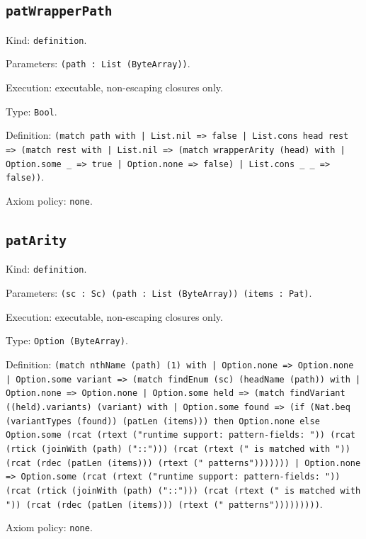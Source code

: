 \documentclass[11pt]{article}
\begin{document}
\subsection*{\texttt{patWrapperPath}}
\noindent Kind: \texttt{definition}.\par
\noindent Parameters: \texttt{(path : List (ByteArray))}.\par
\noindent Execution: executable, non-escaping closures only.\par
\noindent Type: \texttt{Bool}.\par
\noindent Definition: \texttt{(match path with | List.nil => false | List.cons head rest => (match rest with | List.nil => (match wrapperArity (head) with | Option.some \_ => true | Option.none => false) | List.cons \_ \_ => false))}.\par
\noindent Axiom policy: \texttt{none}.\par
\subsection*{\texttt{patArity}}
\noindent Kind: \texttt{definition}.\par
\noindent Parameters: \texttt{(sc : Sc) (path : List (ByteArray)) (items : Pat)}.\par
\noindent Execution: executable, non-escaping closures only.\par
\noindent Type: \texttt{Option (ByteArray)}.\par
\noindent Definition: \texttt{(match nthName (path) (1) with | Option.none => Option.none | Option.some variant => (match findEnum (sc) (headName (path)) with | Option.none => Option.none | Option.some held => (match findVariant ((held).variants) (variant) with | Option.some found => (if (Nat.beq (variantTypes (found)) (patLen (items))) then Option.none else Option.some (rcat (rtext ("runtime support: pattern-fields: ")) (rcat (rtick (joinWith (path) ("::"))) (rcat (rtext (" is matched with ")) (rcat (rdec (patLen (items))) (rtext (" patterns"))))))) | Option.none => Option.some (rcat (rtext ("runtime support: pattern-fields: ")) (rcat (rtick (joinWith (path) ("::"))) (rcat (rtext (" is matched with ")) (rcat (rdec (patLen (items))) (rtext (" patterns")))))))))}.\par
\noindent Axiom policy: \texttt{none}.\par
\end{document}
